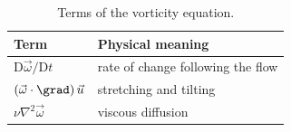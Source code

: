 \begin{table}[htbp]
    \centering
    \caption[Terms of the vorticity equation]{Terms of the vorticity equation.}
    \label{tab:appendix}
    \begin{tabular}{@{}ll@{}}
        \toprule
        Term                                        & Physical meaning                 \\
        \midrule
        $\mathrm{D}\vec{\omega}/\mathrm{D}t$       & rate of change following the flow \\
        $\left( \vec{\omega} \cdot \grad \right) \vec{u}$ & stretching and tilting          \\
        $\nu \nabla^2 \vec{\omega}$                 & viscous diffusion                \\
        \bottomrule
    \end{tabular}
\end{table}
